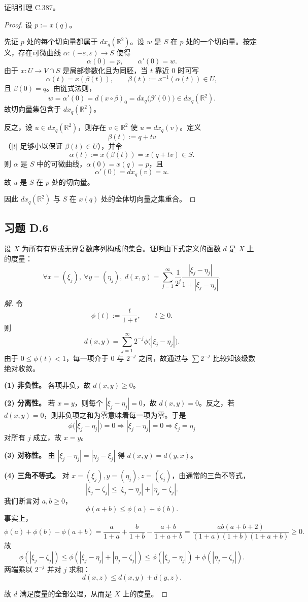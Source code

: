 \documentclass[11pt,a4paper]{article}
\newcommand{\R}{\mathbb{R}}
\theoremstyle{definition}
\newenvironment{solution}{\begin{proof}[解]}{\end{proof}}
\begin{document}
证明引理 C.387。

\begin{proof}
设 $p:=x(q)$。

先证 $p$ 处的每个切向量都属于 $dx_q(\R^2)$。设 $w$ 是 $S$ 在 $p$ 处的一个切向量。按定义，存在可微曲线 $\alpha:(-\varepsilon,\varepsilon)\to S$ 使得
\[
  \alpha(0)=p, \qquad \alpha'(0)=w.
\]
由于 $x:U\to V\cap S$ 是局部参数化且为同胚，当 $t$ 靠近 $0$ 时可写
\[
  \alpha(t)=x(\beta(t)), \qquad
  \beta(t):=x^{-1}(\alpha(t))\in U,
\]
且 $\beta(0)=q$。由链式法则，
\[
  w=\alpha'(0)=d(x\circ\beta)_0=dx_q\big(\beta'(0)\big)\in dx_q(\R^2).
\]
故切向量集包含于 $dx_q(\R^2)$。

反之，设 $u\in dx_q(\R^2)$，则存在 $v\in\R^2$ 使 $u=dx_q(v)$。定义
\[
  \beta(t):=q+tv
\]
（$|t|$ 足够小以保证 $\beta(t)\in U$），并令
\[
  \alpha(t):=x(\beta(t))=x(q+tv)\in S.
\]
则 $\alpha$ 是 $S$ 中的可微曲线，$\alpha(0)=x(q)=p$，且
\[
  \alpha'(0)=dx_q(v)=u.
\]
故 $u$ 是 $S$ 在 $p$ 处的切向量。

因此 $dx_q(\R^2)$ 与 $S$ 在 $x(q)$ 处的全体切向量之集重合。
\end{proof}

\subsection{习题 D.6}

设 $X$ 为所有有界或无界复数序列构成的集合。证明由下式定义的函数 $d$ 是 $X$ 上的度量：
\[
  \forall x=(\xi_j),\ \forall y=(\eta_j),\
  d(x,y)=\sum_{j=1}^{\infty}\frac{1}{2^j}\frac{|\xi_j-\eta_j|}{1+|\xi_j-\eta_j|}.
\]

\begin{solution}
令
\[
  \phi(t):=\frac{t}{1+t},\qquad t\ge 0.
\]
则
\[
  d(x,y)=\sum_{j=1}^{\infty}2^{-j}\phi\big(|\xi_j-\eta_j|\big).
\]
由于 $0\le \phi(t)<1$，每一项介于 $0$ 与 $2^{-j}$ 之间，故通过与 $\sum 2^{-j}$ 比较知该级数绝对收敛。

\textbf{(1) 非负性。} 各项非负，故 $d(x,y)\ge 0$。

\textbf{(2) 分离性。} 若 $x=y$，则每个 $|\xi_j-\eta_j|=0$，故 $d(x,y)=0$。反之，若 $d(x,y)=0$，则非负项之和为零意味着每一项为零。于是
\[
  \phi\big(|\xi_j-\eta_j|\big)=0 \Rightarrow |\xi_j-\eta_j|=0
  \Rightarrow \xi_j=\eta_j
\]
对所有 $j$ 成立，故 $x=y$。

\textbf{(3) 对称性。} 由 $|\xi_j-\eta_j|=|\eta_j-\xi_j|$ 得 $d(x,y)=d(y,x)$。

\textbf{(4) 三角不等式。} 对 $x=(\xi_j), y=(\eta_j), z=(\zeta_j)$，由通常的三角不等式，
\[
  |\xi_j-\zeta_j|\le |\xi_j-\eta_j|+|\eta_j-\zeta_j|.
\]
我们断言对 $a,b\ge 0$，
\[
  \phi(a+b)\le \phi(a)+\phi(b).
\]
事实上，
\[
  \phi(a)+\phi(b)-\phi(a+b)
  = \frac{a}{1+a}+\frac{b}{1+b}-\frac{a+b}{1+a+b}
  = \frac{ab(a+b+2)}{(1+a)(1+b)(1+a+b)}\ge 0.
\]
故
\[
  \phi(|\xi_j-\zeta_j|)
  \le \phi(|\xi_j-\eta_j|+|\eta_j-\zeta_j|)
  \le \phi(|\xi_j-\eta_j|)+\phi(|\eta_j-\zeta_j|).
\]
两端乘以 $2^{-j}$ 并对 $j$ 求和：
\[
  d(x,z)\le d(x,y)+d(y,z).
\]

故 $d$ 满足度量的全部公理，从而是 $X$ 上的度量。
\end{solution}
\end{document}
